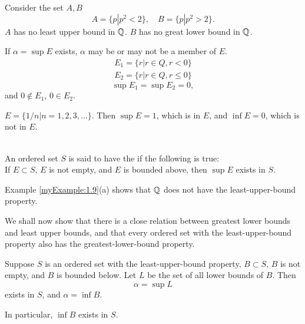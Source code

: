 \begin{myExample}
    \label{myExample:1.9}
    \begin{asparaenum}[(a)]
        \item Consider the set $A, B$
        \begin{equation*}
            A = \{p|p^2 < 2\},\quad
            B = \{p|p^2 > 2\}.
        \end{equation*}
        $A$ has no least upper bound in ${\protect\mathbb Q} $.
        $B$ has no great lower bound in ${\protect\mathbb Q} $.    
        \item If $\alpha = \sup E$ exists, $\alpha$ may be or may not be a member of $E$.
        \begin{align*}
            E_1 = \{r |r\in Q, r < 0\}\\
            E_2 = \{r |r\in Q, r \leq 0\}
        \end{align*}
        \begin{equation*}
            \sup E_1 = \sup E_2 = 0,
        \end{equation*}
        and $0\not\in E_1$, $0\in E_2$.
        \item $E = \{1/n | n = 1,2,3,...\}$. 
        Then $\sup E = 1$, which is in $E$, 
        and $\inf E = 0$, which is not in $E$.
    \end{asparaenum}
\end{myExample}

\begin{mydef}
    \label{mydef:1.10}
    {\color{red}{least-upper-bound property}}\\
    An ordered set $S$ is said to have the  
    if the following is true:\\
    If $E \subset S$, $E$ is not empty, and $E$ is bounded above, then $\sup E$ exists in $S$.
\end{mydef}

Example \ref{myExample:1.9}(a) shows that ${\protect\mathbb Q} $ does not have the least-upper-bound property.

We shall now show that 
there is a close relation between greatest lower bounds and least upper bounds, 
and that every ordered set with the least-upper-bound property 
also has the greatest-lower-bound property.


\begin{thm}
    \label{thm:1.11}
    Suppose $S$ is an ordered set with the least-upper-bound property,
    $B \subset S$, $B$ is not empty, and $B$ is bounded below. 
    Let $L$ be the set of all lower bounds of $B$. 
    Then
    \begin{equation*}
        \alpha = \sup L
    \end{equation*}
    exists in $S$, and $\alpha = \inf B$.

    In particular, $\inf B$ exists in $S$.
\end{thm}


